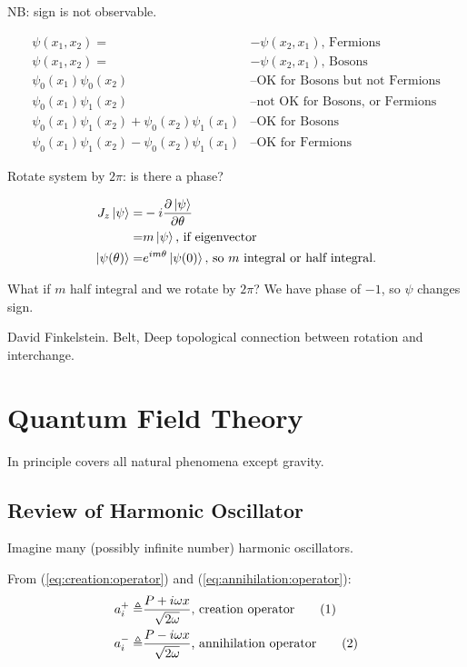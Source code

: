 \documentclass[]{article}
\newcommand\numberthis{\addtocounter{equation}{1}\tag{\theequation}}
\begin{document}
NB: sign is not observable.

\begin{align*}
\psi(x_1,x_2)=&-\psi(x_2,x_1) \text{, Fermions}\\
\psi(x_1,x_2)=&-\psi(x_2,x_1) \text{, Bosons}\\
\psi_0(x_1)\psi_0(x_2)& \text{--OK for Bosons but not Fermions}\\
\psi_0(x_1)\psi_1(x_2)& \text{--not OK for Bosons, or Fermions}\\
\psi_0(x_1)\psi_1(x_2)+\psi_0(x_2)\psi_1(x_1)& \text{--OK for Bosons}\\
\psi_0(x_1)\psi_1(x_2)-\psi_0(x_2)\psi_1(x_1)& \text{--OK for Fermions}
\end{align*}

Rotate system by $2\pi$: is there a phase?

\begin{align*}
J_z\ket{\psi} =& -i \frac{\partial \ket{\psi}}{\partial \theta}\\
=& m\ket{\psi} \text{, if eigenvector}\\
\ket{\psi(\theta)} =& e^{im\theta}\ket{\psi(0)}\text{, so $m$ integral or half integral.}
\end{align*}

What if $m$ half integral and we rotate by $2\pi$? We have phase of $-1$, so $\psi$ changes sign.

David Finkelstein. Belt, Deep topological connection between rotation and interchange.

\section{Quantum Field Theory}

In principle covers all natural phenomena except gravity.

\subsection{Review of Harmonic Oscillator}
Imagine many (possibly infinite number) harmonic oscillators.

From (\ref{eq:creation:operator}) and (\ref{eq:annihilation:operator}):
\begin{align*}
a^+_i \triangleq & \frac{P + i \omega x } {\sqrt{2 \omega}} \text{, creation operator} \numberthis \label{eq:creation:operator:i}\\
a^-_i \triangleq & \frac{P - i \omega x } {\sqrt{2 \omega}}\text{, annihilation operator} \numberthis \label{eq:annihilation:operator_i}\\
\end{align*}
\end{document}
